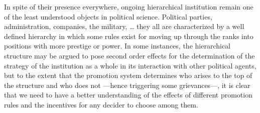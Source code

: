 In spite of their presence everywhere, ongoing hierarchical institution remain
one of the least understood objects in political science. Political parties,
administration, companies, the military, \dots{} they all are characterized by a
well defined hierarchy in which some rules exist for moving up through the ranks
into positions with more prestige or power. In some instances, the hierarchical
structure may be argued to pose second order effects for the determination of
the strategy of the institution as a whole in its interaction with other
political agents, but to the extent that the promotion system determines who
arises to the top of the structure and who does not ---hence triggering some
grievances---, it is clear that we need to have a better understanding of the
effects of different promotion rules and the incentives for any decider to
choose among them. 




